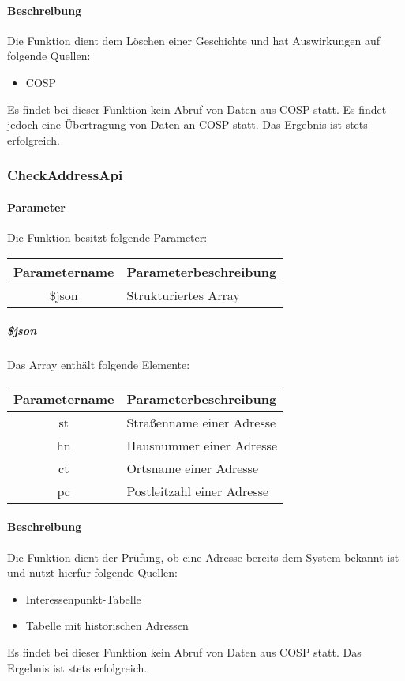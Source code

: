\paragraph{Beschreibung} Die Funktion dient dem Löschen einer Geschichte und hat Auswirkungen auf folgende Quellen:
\begin{itemize}
	\item COSP
\end{itemize}
Es findet bei dieser Funktion kein Abruf von Daten aus {\glqq COSP\grqq} statt. Es findet jedoch eine Übertragung von Daten an {\glqq COSP\grqq} statt. Das Ergebnis ist stets erfolgreich.
\subsubsection{CheckAddressApi}
\paragraph{Parameter} Die Funktion besitzt folgende Parameter:
\begin{table}[H]
	\begin{tabular}{|c|p{11cm}|}
		\hline
		\textbf{Parametername} & \textbf{Parameterbeschreibung} \\ \hline
		\$json & Strukturiertes Array \\ \hline
	\end{tabular}
\end{table}
\subparagraph{\$json}Das Array enthält folgende Elemente:
\begin{table}[H]
	\begin{tabular}{|c|p{11cm}|}
		\hline
		\textbf{Parametername} & \textbf{Parameterbeschreibung} \\ \hline
		st & Straßenname einer Adresse \\ \hline
		hn & Hausnummer einer Adresse \\ \hline
		ct & Ortsname einer Adresse \\ \hline
		pc & Postleitzahl einer Adresse \\ \hline
	\end{tabular}
\end{table}
\paragraph{Beschreibung} Die Funktion dient der Prüfung, ob eine Adresse bereits dem System bekannt ist und nutzt hierfür folgende Quellen:
\begin{itemize}
	\item Interessenpunkt-Tabelle
	\item Tabelle mit historischen Adressen
\end{itemize}
Es findet bei dieser Funktion kein Abruf von Daten aus {\glqq COSP\grqq} statt. Das Ergebnis ist stets erfolgreich.
